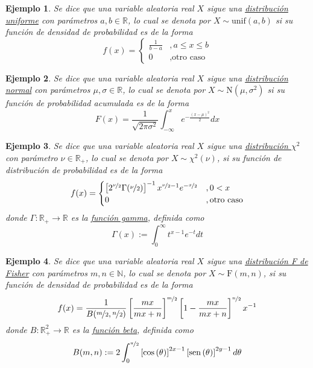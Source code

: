 \documentclass[12pt,letterpaper]{book}
\newtheorem{ejemplo}{Ejemplo}[chapter]
\newcommand{\R}{\mathbb{R}}
\newcommand{\N}{\mathbb{N}}
\newcommand{\COS}[1]{\mathrm{cos}\left( #1 \right)}
\newcommand{\SEN}[1]{\mathrm{sen}\left( #1 \right)}
\begin{document}
\begin{ejemplo}
Se dice que una variable aleatoria real $X$ sigue una \ul{distribuci\'on uniforme} con parámetros $a, b \in \R$, lo cual se denota por $X\sim \text{unif}(a,b)$ si su función de densidad de probabilidad es de la forma
\begin{equation}
f(x) = 
\begin{cases}
\frac{1}{b-a} &, a\leq x \leq b \\
0 &, \text{otro caso}
\end{cases}
\end{equation}
\end{ejemplo}

\begin{ejemplo}
Se dice que una variable aleatoria real $X$ sigue una \ul{distribuci\'on normal} con parámetros $\mu, \sigma \in \R$, lo cual se denota por $X\sim \text{N}(\mu,\sigma^{2})$ si su función de probabilidad acumulada es de la forma
\begin{equation}
F(x) = \frac{1}{\sqrt{2 \pi \sigma^{2}}} \int_{-\infty}^{x} e^{-\frac{(x-\mu)^{2}}{2}} dx
\end{equation}
\end{ejemplo}

\begin{ejemplo}
Se dice que una variable aleatoria real $X$ sigue una \ul{distribuci\'on $\chi^2$} con parámetro $\nu\in \R_+$, lo cual se denota por $X\sim \chi^2(\nu)$, si su función de distribución de probabilidad es de la forma
\begin{equation}
f(x) = \begin{cases}
\left[ 2^{\nicefrac{\nu}{2}} \Gamma(\nicefrac{\nu}{2}) \right]^{-1} x^{\nicefrac{\nu}{2}-1} e^{-\nicefrac{x}{2}} &, 0 < x \\
0 &, \text{otro caso}
\end{cases}
\end{equation}
donde $\Gamma: \R_+ \rightarrow \R$ es la \underline{función gamma}, definida como
\begin{equation}
\Gamma(x) := \int_{0}^{\infty} t^{x-1} e^{-t} dt
\end{equation}
\end{ejemplo}

\begin{ejemplo}
Se dice que una variable aleatoria real $X$ sigue una \ul{distribuci\'on F de Fisher} con parámetros $m, n \in \N$, lo cual se denota por $X\sim \text{F}(m,n)$, si su función de densidad de probabilidad es de la forma
\begin{equation}
f(x) = \frac{1}{B(\nicefrac{m}{2},\nicefrac{n}{2})} \left[ \frac{m x}{m x + n} \right]^{\nicefrac{m}{2}} \left[ 1- \frac{m x}{m x + n} \right]^{\nicefrac{n}{2}} x^{-1}
\end{equation}
donde $B: \R_+^2 \rightarrow \R$ es la \underline{función beta}, definida como
\begin{equation}
B(m,n) := 2 \int_0^{\nicefrac{\pi}{2}} \left[\COS{\theta} \right]^{2x-1} \left[\SEN{\theta} \right]^{2y-1} d\theta
\end{equation}
\end{ejemplo}
\end{document}
